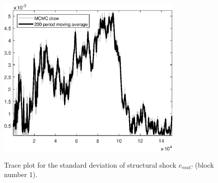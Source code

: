 \begin{figure}[H]
\centering
  \includegraphics[width=0.8\textwidth]{BRS_sectoral_wo_gmf/graphs/TracePlot_SE_e_muC_blck_1}\\
    \caption{Trace plot for the standard deviation of structural shock ${e_{muC}}$ (block number 1).}
\end{figure}
